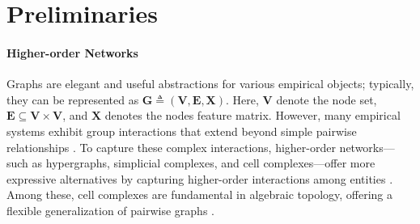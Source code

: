 \section{Preliminaries}


\paragraph{Higher-order Networks}
Graphs are elegant and useful abstractions for various empirical objects; typically, they can be represented as $\bm{G} \triangleq (\bm{V},\bm{E}, \bm{X})$. Here, $\bm{V}$ denote the node set, $\bm{E}\subseteq \bm{V}\times\bm{V}$, and  $\bm{X}$ denotes the nodes feature matrix. 
However, many empirical systems exhibit group interactions that extend beyond simple pairwise relationships \cite{HigherOrderReview2020}.
%
To capture these complex interactions, higher-order networks—such as hypergraphs, simplicial complexes, and cell complexes—offer more expressive alternatives by capturing higher-order interactions among entities \cite{TDL-position+ICML2024}.
%
Among these, cell complexes are fundamental in algebraic topology, offering a flexible generalization of pairwise graphs \cite{Top_Hodge_Hatcher+2001}.
% 

